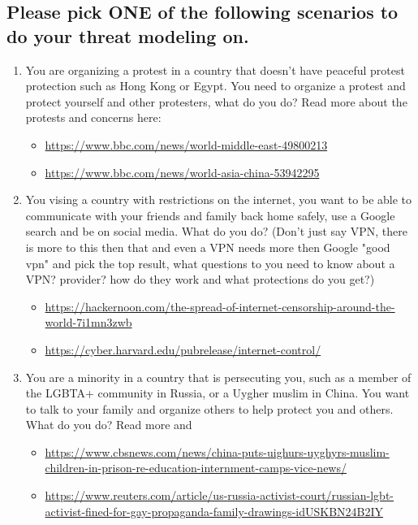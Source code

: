 \documentclass[12pt]{article}
\begin{document}
\subsection*{Please pick ONE of the following scenarios to do your threat modeling on.}
    \begin{enumerate}
        \item You are organizing a protest in a country that doesn't have peaceful protest protection such as Hong Kong or Egypt. You need to organize a protest and protect yourself and other protesters, what do you do? Read more about the protests and concerns here:
        \begin{itemize}
            \item \url{https://www.bbc.com/news/world-middle-east-49800213}
            \item \url{https://www.bbc.com/news/world-asia-china-53942295}
        \end{itemize}    
        
        \item You vising a country with restrictions on the internet, you want to be able to communicate with your friends and family back home safely, use a Google search and be on social media. What do you do? (Don't just say VPN, there is more to this then that and even a VPN needs more then Google "good vpn" and pick the top result, what questions to you need to know about a VPN? provider? how do they work and what protections do you get?) 
         \begin{itemize}
            \item \url{https://hackernoon.com/the-spread-of-internet-censorship-around-the-world-7i1mn3zwb}
            \item \url{https://cyber.harvard.edu/pubrelease/internet-control/}
        \end{itemize} 
        
        \item You are a minority in a country that is persecuting you, such as a member of the LGBTA+ community in Russia, or a Uygher muslim in China. You want to talk to your family and organize others to help protect you and others. What do you do? Read more  and 
         \begin{itemize}
            \item \url{https://www.cbsnews.com/news/china-puts-uighurs-uyghyrs-muslim-children-in-prison-re-education-internment-camps-vice-news/}
            \item \url{https://www.reuters.com/article/us-russia-activist-court/russian-lgbt-activist-fined-for-gay-propaganda-family-drawings-idUSKBN24B2IY}
        \end{itemize} 


\end{enumerate}
\end{document}

